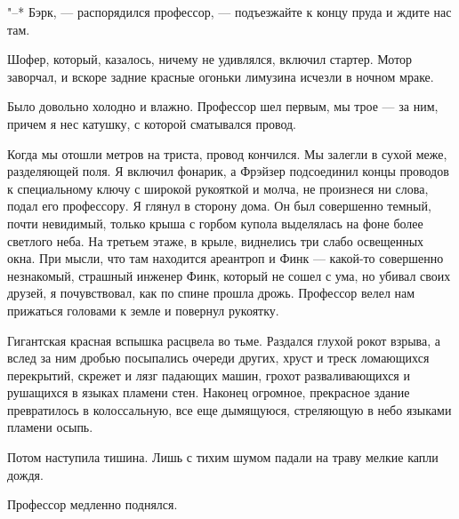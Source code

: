 "--* Бэрк, --- распорядился профессор, --- подъезжайте к концу пруда  и  ждите
нас там.

Шофер, который, казалось, ничему не удивлялся, включил  стартер.  Мотор
заворчал, и вскоре задние красные огоньки лимузина исчезли в ночном мраке.

Было довольно холодно и влажно. Профессор шел первым, мы трое --- за ним,
причем я нес катушку, с которой сматывался провод.

Когда мы отошли метров на триста, провод кончился. Мы залегли  в  сухой
меже, разделяющей поля. Я включил фонарик,  а  Фрэйзер  подсоединил  концы
проводов к специальному ключу с широкой рукояткой и молча, не произнеся ни
слова, подал его профессору. Я глянул в сторону дома.  Он  был  совершенно
темный, почти невидимый, только крыша с горбом купола выделялась  на  фоне
более светлого неба. На  третьем  этаже,  в  крыле,  виднелись  три  слабо
освещенных окна. При мысли, что там находится ареантроп и Финк ---  какой-то
совершенно незнакомый, страшный инженер Финк, который не сошел с  ума,  но
убивал своих друзей, я почувствовал, как по спине прошла дрожь.  Профессор
велел нам прижаться головами к земле и повернул рукоятку.

Гигантская красная вспышка расцвела  во  тьме.  Раздался  глухой  рокот
взрыва, а вслед за ним дробью посыпались очереди  других,  хруст  и  треск
ломающихся   перекрытий,   скрежет   и   лязг   падающих   машин,   грохот
разваливающихся и рушащихся  в  языках  пламени  стен.  Наконец  огромное,
прекрасное  здание  превратилось  в  колоссальную,  все   еще   дымящуюся,
стреляющую в небо языками пламени осыпь.

Потом наступила тишина. Лишь с тихим шумом падали на траву мелкие капли
дождя.

Профессор медленно поднялся.

